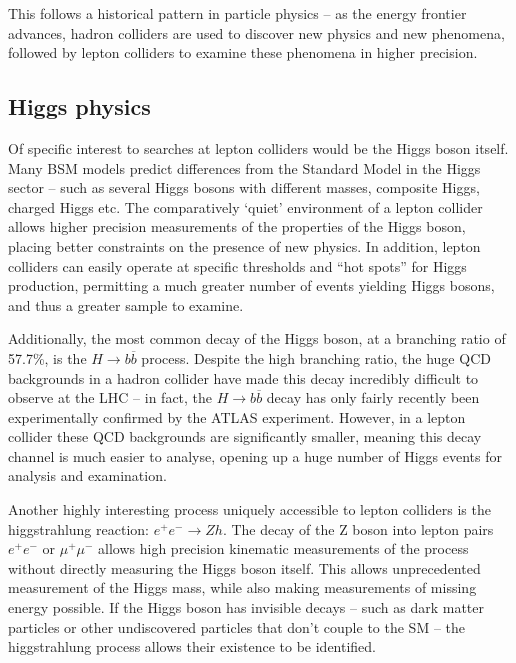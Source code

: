 This follows a historical pattern in particle physics -- as the energy frontier advances, hadron colliders are used to discover new physics and new phenomena, followed by lepton colliders to examine these phenomena in higher precision.

\subsection{Higgs physics}
Of specific interest to searches at lepton colliders would be the Higgs boson itself. Many \acrshort{BSM} models predict differences from the Standard Model in the Higgs sector -- such as several Higgs bosons with different masses, composite Higgs, charged Higgs etc. The comparatively `quiet' environment of a lepton collider allows higher precision measurements of the properties of the Higgs boson, placing better constraints on the presence of new physics. In addition, lepton colliders can easily operate at specific thresholds and ``hot spots'' for Higgs production, permitting a much greater number of events yielding Higgs bosons, and thus a greater sample to examine.

Additionally, the most common decay of the Higgs boson, at a branching ratio of 57.7\%, is the $H \rightarrow b \overline{b}$ process. Despite the high branching ratio, the huge \acrshort{QCD} backgrounds in a hadron collider have made this decay incredibly difficult to observe at the LHC -- in fact, the $H \rightarrow b \overline{b}$ decay has only fairly recently been experimentally confirmed by the \acrshort{ATLAS} experiment. However, in a lepton collider these \acrshort{QCD} backgrounds are significantly smaller, meaning this decay channel is much easier to analyse, opening up a huge number of Higgs events for analysis and examination.

Another highly interesting process uniquely accessible to lepton colliders is the higgstrahlung reaction: $e^+ e^- \rightarrow Zh$. The decay of the Z boson into lepton pairs $e^+ e^-$ or $\mu^+ \mu^-$ allows high precision kinematic measurements of the process without directly measuring the Higgs boson itself. This allows unprecedented measurement of the Higgs mass, while also making measurements of missing energy possible. If the Higgs boson has invisible decays -- such as dark matter particles or other undiscovered particles that don't couple to the \acrshort{SM} -- the higgstrahlung process allows their existence to be identified.

